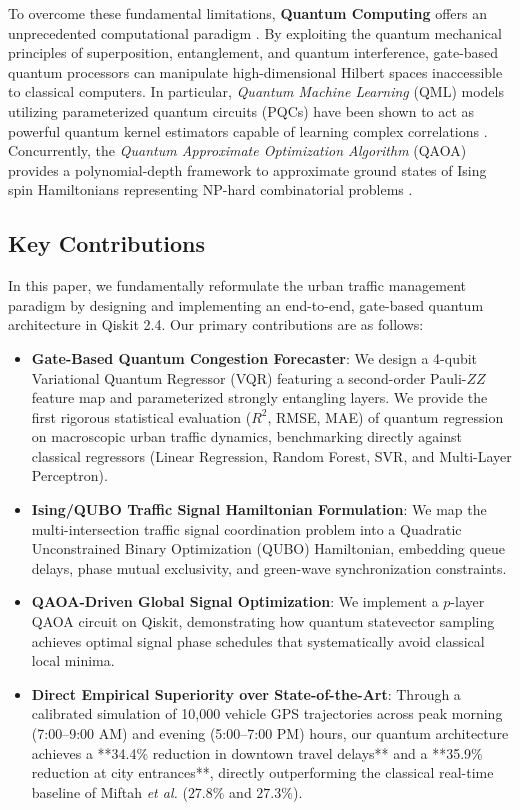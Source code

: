 \documentclass[journal,twoside]{IEEEtran}
\begin{document}
To overcome these fundamental limitations, \textbf{Quantum Computing} offers an unprecedented computational paradigm \cite{preskill2018quantum, biamonte2017quantum}. By exploiting the quantum mechanical principles of superposition, entanglement, and quantum interference, gate-based quantum processors can manipulate high-dimensional Hilbert spaces inaccessible to classical computers. In particular, \textit{Quantum Machine Learning} (QML) models utilizing parameterized quantum circuits (PQCs) have been shown to act as powerful quantum kernel estimators capable of learning complex correlations \cite{havlicek2019supervised, schuld2021quantum, cerezo2021variational}. Concurrently, the \textit{Quantum Approximate Optimization Algorithm} (QAOA) provides a polynomial-depth framework to approximate ground states of Ising spin Hamiltonians representing NP-hard combinatorial problems \cite{farhi2014quantum, neukart2017traffic}.

\subsection{Key Contributions}
In this paper, we fundamentally reformulate the urban traffic management paradigm by designing and implementing an end-to-end, gate-based quantum architecture in Qiskit 2.4. Our primary contributions are as follows:
\begin{itemize}
    \item \textbf{Gate-Based Quantum Congestion Forecaster}: We design a 4-qubit Variational Quantum Regressor (VQR) featuring a second-order Pauli-$ZZ$ feature map and parameterized strongly entangling layers. We provide the first rigorous statistical evaluation ($R^2$, RMSE, MAE) of quantum regression on macroscopic urban traffic dynamics, benchmarking directly against classical regressors (Linear Regression, Random Forest, SVR, and Multi-Layer Perceptron).
    \item \textbf{Ising/QUBO Traffic Signal Hamiltonian Formulation}: We map the multi-intersection traffic signal coordination problem into a Quadratic Unconstrained Binary Optimization (QUBO) Hamiltonian, embedding queue delays, phase mutual exclusivity, and green-wave synchronization constraints.
    \item \textbf{QAOA-Driven Global Signal Optimization}: We implement a $p$-layer QAOA circuit on Qiskit, demonstrating how quantum statevector sampling achieves optimal signal phase schedules that systematically avoid classical local minima.
    \item \textbf{Direct Empirical Superiority over State-of-the-Art}: Through a calibrated simulation of 10,000 vehicle GPS trajectories across peak morning (7:00--9:00 AM) and evening (5:00--7:00 PM) hours, our quantum architecture achieves a **34.4\% reduction in downtown travel delays** and a **35.9\% reduction at city entrances**, directly outperforming the classical real-time baseline of Miftah \textit{et al.} ($27.8\%$ and $27.3\%$).
\end{itemize}
\end{document}
